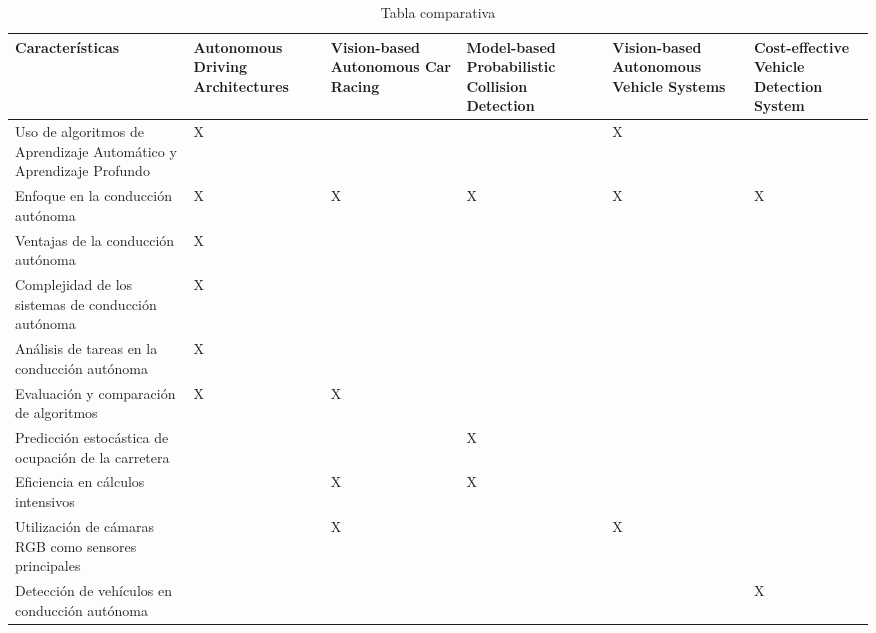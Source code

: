 \documentclass[10pt,letterpaper,final]{article}
\begin{document}
    
    \begin{table}
        \centering
        \caption{Tabla comparativa}
        \begin{tabular}{|p{4cm}|p{2cm}|p{2cm}|p{2cm}|p{2cm}|p{2cm}|}
            \hline
            \textbf{Características}
            & \textbf{Autonomous Driving Architectures \cite{bachute2021autonomous}}
            & \textbf{Vision-based Autonomous Car Racing \cite{cai2021vision}}
            & \textbf{Model-based Probabilistic Collision Detection \cite{althoff2009model}}
            & \textbf{Vision-based Autonomous Vehicle Systems \cite{pavel2022vision}}
            & \textbf{Cost-effective Vehicle Detection System \cite{alam2022cost}} \\
            \hline
            Uso de algoritmos de Aprendizaje Automático y Aprendizaje Profundo & X &   &   & X &   \\
            \hline
            Enfoque en la conducción autónoma                                  & X & X & X & X & X \\
            \hline
            Ventajas de la conducción autónoma                                 & X &   &   &   &   \\
            \hline
            Complejidad de los sistemas de conducción autónoma                 & X &   &   &   &   \\
            \hline
            Análisis de tareas en la conducción autónoma                       & X &   &   &   &   \\
            \hline
            Evaluación y comparación de algoritmos                             & X & X &   &   &   \\
            \hline
            Predicción estocástica de ocupación de la carretera                &   &   & X &   &   \\
            \hline
            Eficiencia en cálculos intensivos                                  &   & X & X &   &   \\
            \hline
            Utilización de cámaras RGB como sensores principales               &   & X &   & X &   \\
            \hline
            Detección de vehículos en conducción autónoma                      &   &   &   &   & X \\
            \hline
        \end{tabular}
    \end{table}
    \clearpage
\end{document}

